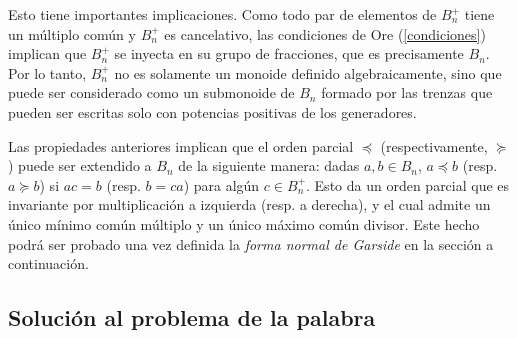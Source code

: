 \documentclass[bibtex, anon]{TEMat-article}
\begin{document}

Esto tiene importantes implicaciones. Como todo par de elementos de $B_n^+$ tiene un múltiplo común y $B_n^+$ es cancelativo, las condiciones de Ore (\cref{condiciones}) implican que $B_n^+$ se inyecta en su grupo de fracciones, que es precisamente $B_n$. Por lo tanto, $B_n^+$ no es solamente un monoide definido algebraicamente, sino que puede ser considerado como un submonoide de $B_n$ formado por las trenzas que pueden ser escritas solo con potencias positivas de los generadores. 

Las propiedades anteriores implican que el orden parcial $\preccurlyeq$ (respectivamente, $\succcurlyeq$) puede ser extendido a $B_n$ de la siguiente manera: dadas $a,b\in B_n$, $a\preccurlyeq b$ (resp. $a\succcurlyeq b$) si $ac=b$ (resp. $b=ca$) para algún $c\in B_n^+$. Esto da un orden parcial que es invariante por multiplicación a izquierda (resp. a derecha), y el cual admite un único mínimo común múltiplo y un único máximo común divisor. Este hecho podrá ser probado una vez definida la \emph{forma normal de Garside} en la sección a continuación.




\subsection{Solución al problema de la palabra}
\end{document}
